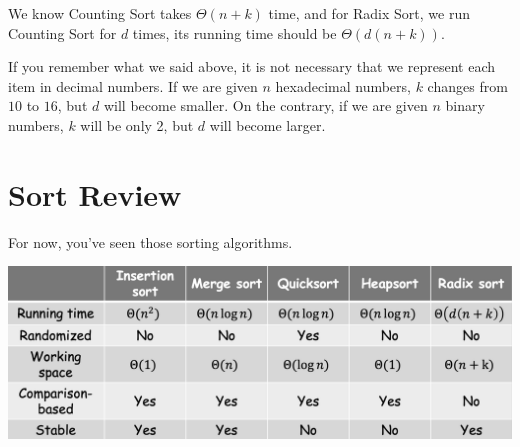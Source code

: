 \begin{spacing}{1.3}
    We know Counting Sort takes $\Theta(n+k)$ time, and for Radix Sort, we run 
    Counting Sort for $d$ times, its running time should be $\Theta(d(n+k))$.

    If you remember what we said above, it is not necessary that we represent each 
    item in decimal numbers. If we are given $n$ hexadecimal numbers, $k$ changes 
    from $10$ to $16$, but $d$ will become smaller. On the contrary, if we are given 
    $n$ binary numbers, $k$ will be only 2, but $d$ will become larger.


    \section{Sort Review}

    For now, you've seen those sorting algorithms.
    \begin{center}
        \includegraphics[scale=0.4]{images/06-sort-review.png}
    \end{center}

    
\end{spacing}